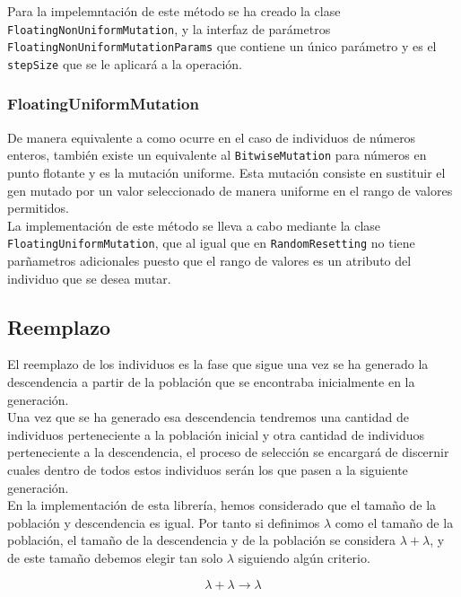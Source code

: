 Para la impelemntación de este método se ha creado la clase \texttt{FloatingNonUniformMutation}, y la interfaz de parámetros \texttt{FloatingNonUniformMutationParams} que contiene un único parámetro y es el \texttt{stepSize} que se le aplicará a la operación.

\subsubsection{FloatingUniformMutation}

De manera equivalente a como ocurre en el caso de individuos de números enteros, también existe un equivalente al \texttt{BitwiseMutation} para números en punto flotante y es la mutación uniforme. Esta mutación consiste en sustituir el gen mutado por un valor seleccionado de manera uniforme en el rango de valores permitidos. \\

La implementación de este método se lleva a cabo mediante la clase \texttt{FloatingUniformMutation}, que al igual que en \texttt{RandomResetting} no tiene parñametros adicionales puesto que el rango de valores es un atributo del individuo que se desea mutar.

\subsection{Reemplazo}

El reemplazo de los individuos es la fase que sigue una vez se ha generado la descendencia a partir de la población que se encontraba inicialmente en la generación. \\

Una vez que se ha generado esa descendencia tendremos una cantidad de individuos perteneciente a la población inicial y otra cantidad de individuos perteneciente a la descendencia, el proceso de selección se encargará de discernir cuales dentro de todos estos individuos serán los que pasen a la siguiente generación. \\

En la implementación de esta librería, hemos considerado que el tamaño de la población y descendencia es igual. Por tanto si definimos $\lambda$ como el tamaño de la población, el tamaño de la descendencia y de la población se considera $\lambda + \lambda$, y de este tamaño debemos elegir tan solo $\lambda$ siguiendo algún criterio.

\begin{equation}
    \lambda + \lambda \rightarrow \lambda
\end{equation}

